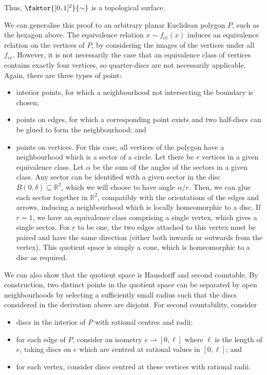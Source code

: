 \begin{example}
\begin{example}
		Thus, $\faktor{[0,1]^2}{\sim}$ is a topological surface.
	\end{example}
	We can generalise this proof to an arbitrary planar Euclidean polygon $P$, such as the hexagon above.
	The equivalence relation $x \sim f_{e \hat e}(x)$ induces an equivalence relation on the vertices of $P$, by considering the images of the vertices under all $f_{e\hat e}$.
	However, it is not necessarily the case that an equivalence class of vertices contains exactly four vertices, so quarter-discs are not necessarily applicable.
	Again, there are three types of point:
	\begin{itemize}
		\item interior points, for which a neighbourhood not intersecting the boundary is chosen;
		\item points on edges, for which a corresponding point exists and two half-discs can be glued to form the neighbourhood; and
		\item points on vertices.
		      For this case, all vertices of the polygon have a neighbourhood which is a sector of a circle.
		      Let there be $r$ vertices in a given equivalence class.
		      Let $\alpha$ be the sum of the angles of the sectors in a given class.
		      Any sector can be identified with a given sector in the disc $B(0,\delta) \subseteq \mathbb R^2$, which we will choose to have angle $\alpha / r$.
		      Then, we can glue each sector together in $\mathbb R^2$, compatibly with the orientations of the edges and arrows, inducing a neighbourhood which is locally homeomorphic to a disc.
		      If $r = 1$, we have an equivalence class comprising a single vertex, which gives a single sector.
		      For $r$ to be one, the two edges attached to this vertex must be paired and have the same direction (either both inwards or outwards from the vertex).
		      This quotient space is simply a cone, which is homeomorphic to a disc as required.
	\end{itemize}
	We can also show that the quotient space is Hausdorff and second countable.
	By construction, two distinct points in the quotient space can be separated by open neighbourhoods by selecting a sufficiently small radius such that the discs considered in the derivation above are disjoint.
	For second countability, consider
	\begin{itemize}
		\item discs in the interior of $P$ with rational centres and radii;
		\item for each edge of $P$, consider an isometry $e \to [0, \ell]$ where $\ell$ is the length of $e$, taking discs on $e$ which are centred at rational values in $[0,\ell]$; and
		\item for each vertex, consider discs centred at these vertices with rational radii.
	\end{itemize}
\end{example}

